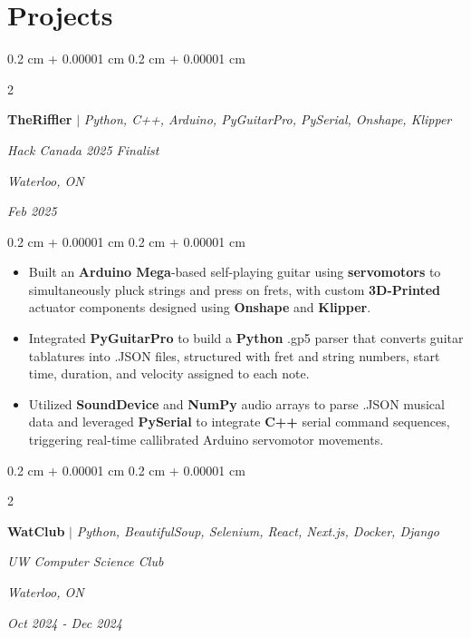 \documentclass[10pt, letterpaper]{article}
\newenvironment{highlights}{
    \begin{itemize}[
        topsep=0.10 cm,
        parsep=0.10 cm,
        partopsep=0pt,
        itemsep=0pt,
        leftmargin=0.4 cm + 10pt
    ]
}{
    \end{itemize}
} %
\newenvironment{onecolentry}{
    \begin{adjustwidth}{
        0.2 cm + 0.00001 cm
    }{
        0.2 cm + 0.00001 cm
    }
}{
    \end{adjustwidth}
} %
\newenvironment{twocolentry}[2][]{
    \onecolentry
    \def\secondColumn{#2}
    \setcolumnwidth{\fill, 4.5 cm}
    \begin{paracol}{2}
}{
    \switchcolumn \raggedleft \secondColumn
    \end{paracol}
    \endonecolentry
} %
\let\hrefWithoutArrow\href
\renewcommand{\href}[2]{\hrefWithoutArrow{#1}{\ifthenelse{\equal{#2}{}}{ }{#2 }\raisebox{.15ex}{\footnotesize \faExternalLink*}}}
\begin{document}
    \section{Projects}

       \begin{twocolentry}{
         \textit{Waterloo, ON}    
            
        \textit{Feb 2025}}
            \textbf{\textbf{TheRiffler }}\mbox{\hrefWithoutArrow{https://github.com/vinny-nguyen/TheRiffler}{\color{black}{\footnotesize\faGithub}}}
            $|$ \emph{Python, C++, Arduino, PyGuitarPro, PySerial, Onshape, Klipper}
            
            \textit{Hack Canada 2025 Finalist}
        \end{twocolentry}
        
        \vspace{0.10 cm}
        \begin{onecolentry}
            \begin{highlights}
                \item Built an \textbf{Arduino Mega}-based self-playing guitar using \textbf{servomotors} to simultaneously pluck strings and press on frets, with custom \textbf{3D-Printed} actuator components designed using \textbf{Onshape} and \textbf{Klipper}.
                \item Integrated \textbf{PyGuitarPro} to build a \textbf{Python} .gp5 parser that converts guitar tablatures into .JSON files, structured with fret and string numbers, start time, duration, and velocity assigned to each note.
                \item Utilized \textbf{SoundDevice} and \textbf{NumPy} audio arrays to parse .JSON musical data and leveraged \textbf{PySerial} to integrate \textbf{C++} serial command sequences, triggering real-time callibrated Arduino servomotor movements.
            \end{highlights}
        \end{onecolentry}

    \vspace{0.2 cm}

\begin{twocolentry}{
        \textit{Waterloo, ON}    
            
        \textit{Oct 2024 - Dec 2024}}
            \textbf{\textbf{WatClub }}\mbox{\hrefWithoutArrow{https://github.com/Brucewang15/WatClub}{\color{black}{\footnotesize\faGithub}}} $|$ \emph{Python, BeautifulSoup, Selenium, React, Next.js, Docker, Django}
            
            \textit{UW Computer Science Club}
        \end{twocolentry}
        
\end{document}
